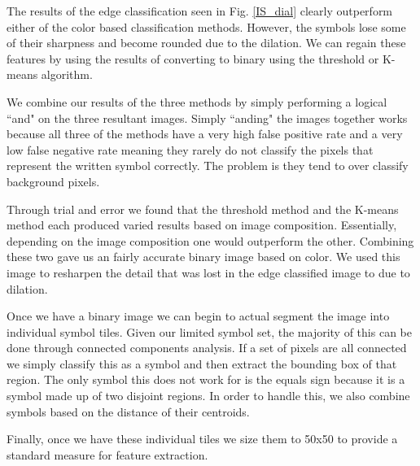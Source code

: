 
The results of the edge classification seen in Fig. \ref{IS_dial} clearly outperform either of the color based classification methods. However, the symbols lose some of their sharpness and become rounded due to the dilation. We can regain these features by using the results of converting to binary using the threshold or K-means algorithm.

We combine our results of the three methods by simply performing a logical ``and" on the three resultant images. Simply ``anding" the images together works because all three of the methods have a very high false positive rate and a very low false negative rate meaning they rarely do not classify the pixels that represent the written symbol correctly. The problem is they tend to over classify background pixels.


Through trial and error we found that the threshold method and the K-means method each produced varied results based on image composition. Essentially, depending on the image composition one would outperform the other. Combining these two gave us an fairly accurate binary image based on color. We used this image to resharpen the detail that was lost in the edge classified image to due to dilation.

Once we have a binary image we can begin to actual segment the image into individual symbol tiles. Given our limited symbol set, the majority of this can be done through connected components analysis. If a set of pixels are all connected we simply classify this as a symbol and then extract the bounding box of that region. The only symbol this does not work for is the equals sign because it is a symbol made up of two disjoint regions. In order to handle this, we also combine symbols based on the distance of their centroids.

Finally, once we have these individual tiles we size them to 50x50 to provide a standard measure for feature extraction.  

